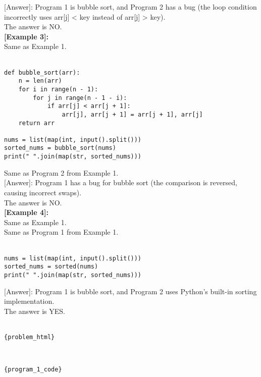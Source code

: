 [Answer]: Program 1 is bubble sort, and Program 2 has a bug (the loop condition incorrectly uses arr[j] < key instead of arr[j] > key).\\
The answer is NO.\\

\noindent\textbf{[Example 3]:}\\
 Same as Example 1.\\
\text{[Program 1]:}\\
\begin{lstlisting}
def bubble_sort(arr):
    n = len(arr)
    for i in range(n - 1):
        for j in range(n - 1 - i):
            if arr[j] < arr[j + 1]:  
                arr[j], arr[j + 1] = arr[j + 1], arr[j]
    return arr

nums = list(map(int, input().split()))
sorted_nums = bubble_sort(nums)
print(" ".join(map(str, sorted_nums)))
\end{lstlisting}

\text{[Program 2]:} Same as Program 2 from Example 1.\\

[Answer]: Program 1 has a bug for bubble sort (the comparison is reversed, causing incorrect swaps).\\
The answer is NO.\\

\noindent\textbf{[Example 4]:}\\
 Same as Example 1.\\
\text{[Program 1]:} Same as Program 1 from Example 1.\\
\text{[Program 2]:}\\
\begin{lstlisting}
nums = list(map(int, input().split()))
sorted_nums = sorted(nums)
print(" ".join(map(str, sorted_nums)))
\end{lstlisting}

[Answer]: Program 1 is bubble sort, and Program 2 uses Python's built-in sorting implementation.\\
The answer is YES.\\

\\
\begin{lstlisting}
{problem_html}
\end{lstlisting}

\text{[Program 1]:}\\
\begin{lstlisting}
{program_1_code}
\end{lstlisting}

